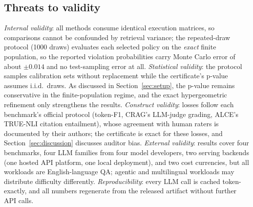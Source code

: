 \subsection{Threats to validity}
\emph{Internal validity}: all methods consume identical execution
matrices, so comparisons cannot be confounded by retrieval variance;
the repeated-draw protocol (1000 draws) evaluates each selected policy
on the \emph{exact} finite population, so the reported violation
probabilities carry Monte Carlo error of about $\pm 0.014$ and no
test-sampling error at all. \emph{Statistical validity}: the protocol
samples calibration sets without replacement while the certificate's
p-value assumes i.i.d.\ draws. As discussed in Section~\ref{sec:setup},
the p-value remains conservative in the finite-population regime, and
the exact hypergeometric refinement only strengthens the results.
\emph{Construct validity}: losses follow each benchmark's official
protocol (token-F1, CRAG's LLM-judge grading, ALCE's TRUE-NLI citation
entailment), whose agreement with human raters is documented by their
authors; the certificate is exact for these losses, and
Section~\ref{sec:discussion} discusses auditor bias. \emph{External
validity}: results cover four benchmarks, four LLM families from four
model developers, two serving backends (one hosted API platform, one
local deployment), and two cost currencies, but all workloads are
English-language QA; agentic and multilingual workloads may distribute
difficulty differently. \emph{Reproducibility}: every LLM call is
cached token-exactly, and all numbers regenerate from the released
artifact without further API calls.
